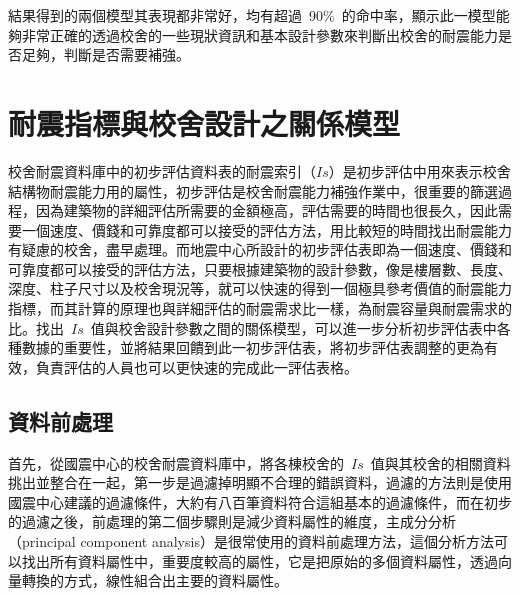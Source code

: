 結果得到的兩個模型其表現都非常好，均有超過~90\%~的命中率，顯示此一模型能夠非常正確的透過校舍的一些現狀資訊和基本設計參數來判斷出校舍的耐震能力是否足夠，判斷是否需要補強。
















\section{耐震指標與校舍設計之關係模型}

校舍耐震資料庫中的初步評估資料表的耐震索引（$Is$）是初步評估中用來表示校舍結構物耐震能力用的屬性，初步評估是校舍耐震能力補強作業中，很重要的篩選過程，因為建築物的詳細評估所需要的金額極高，評估需要的時間也很長久，因此需要一個速度、價錢和可靠度都可以接受的評估方法，用比較短的時間找出耐震能力有疑慮的校舍，盡早處理。而地震中心所設計的初步評估表即為一個速度、價錢和可靠度都可以接受的評估方法，只要根據建築物的設計參數，像是樓層數、長度、深度、柱子尺寸以及校舍現況等，就可以快速的得到一個極具參考價值的耐震能力指標，而其計算的原理也與詳細評估的耐震需求比一樣，為耐震容量與耐震需求的比。找出~$Is$~值與校舍設計參數之間的關係模型，可以進一步分析初步評估表中各種數據的重要性，並將結果回饋到此一初步評估表，將初步評估表調整的更為有效，負責評估的人員也可以更快速的完成此一評估表格。


\subsection{資料前處理}

首先，從國震中心的校舍耐震資料庫中，將各棟校舍的~$Is$~值與其校舍的相關資料挑出並整合在一起，第一步是過濾掉明顯不合理的錯誤資料，過濾的方法則是使用國震中心建議的過濾條件，大約有八百筆資料符合這組基本的過濾條件，而在初步的過濾之後，前處理的第二個步驟則是減少資料屬性的維度，主成分分析（principal component analysis）是很常使用的資料前處理方法，這個分析方法可以找出所有資料屬性中，重要度較高的屬性，它是把原始的多個資料屬性，透過向量轉換的方式，線性組合出主要的資料屬性。

